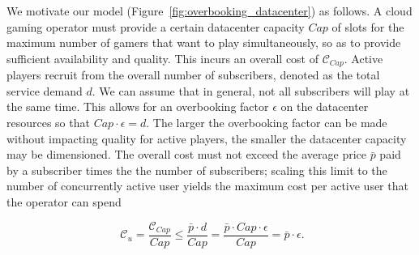 
We motivate our model (Figure~\ref{fig:overbooking_datacenter}) as follows. A cloud gaming operator must provide a certain datacenter capacity $Cap$ of slots for the maximum number of gamers that want to play simultaneously, so as to provide sufficient availability and quality. This incurs an overall cost of $\mathcal{C}_{Cap}$. Active players recruit from the overall number of subscribers, denoted as the total service demand $d$. We can assume that in general, not all subscribers will play at the same time. This allows for an overbooking factor $\epsilon$ on the datacenter resources so that $Cap \cdot \epsilon = d$. The larger the overbooking factor can be made without impacting quality for active players, the smaller the datacenter capacity may be dimensioned. %
The overall cost must not exceed the average price $\bar{p}$ paid by a subscriber times the the number of subscribers;
scaling this limit to the number of concurrently active user yields the maximum cost per active user that the operator can spend

\begin{equation}
  \phantom{\text{.}}\mathcal{C}_u = \frac{\mathcal{C}_{Cap}}{Cap} \leq \frac{\bar{p} \cdot d}{Cap} = \frac{\bar{p} \cdot Cap \cdot \epsilon}{Cap} = \bar{p} \cdot \epsilon\text{.}
\end{equation}



